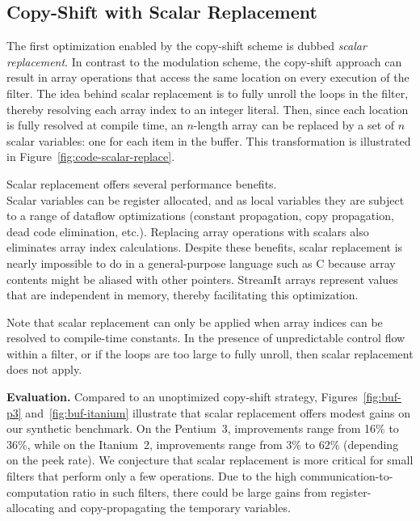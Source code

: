 \subsection{Copy-Shift with Scalar Replacement}
\label{sec:scalar-replacement}

The first optimization enabled by the copy-shift scheme is dubbed {\it
scalar replacement}.  In contrast to the modulation scheme, the
copy-shift approach can result in array operations that access the
same location on every execution of the filter.  The idea behind
scalar replacement is to fully unroll the loops in the filter, thereby
resolving each array index to an integer literal.  Then, since each
location is fully resolved at compile time, an $n$-length array can be
replaced by a set of $n$ scalar variables: one for each item in the
buffer.  This transformation is illustrated in
Figure~\ref{fig:code-scalar-replace}.

Scalar replacement offers several performance benefits.\\ Scalar
variables can be register allocated, and as local variables they are
subject to a range of dataflow optimizations (constant propagation,
copy propagation, dead code elimination, etc.).  Replacing array
operations with scalars also eliminates array index calculations.
Despite these benefits, scalar replacement is nearly impossible to do
in a general-purpose language such as C because array contents might
be aliased with other pointers.  StreamIt arrays represent values that
are independent in memory, thereby facilitating this optimization.

Note that scalar replacement can only be applied when array indices
can be resolved to compile-time constants.  In the presence of unpredictable
control flow within a filter, or if the loops are too large to fully unroll,
then scalar replacement does not apply.

{\bf Evaluation.}  Compared to an unoptimized copy-shift strategy,
Figures~\ref{fig:buf-p3} and~\ref{fig:buf-itanium} illustrate that
scalar replacement offers modest gains on our synthetic benchmark.  On
the Pentium~3, improvements range from 16\% to 36\%, while on the
Itanium~2, improvements range from 3\% to 62\% (depending on the peek
rate).  We conjecture that scalar replacement is more critical for
small filters that perform only a few operations.  Due to the high
communication-to-computation ratio in such filters, there could be
large gains from register-allocating and copy-propagating the
temporary variables.

